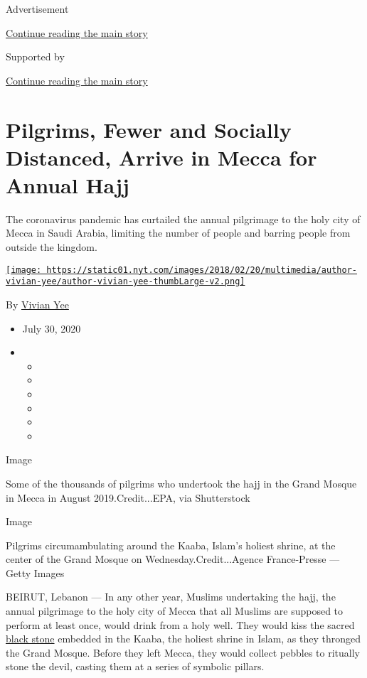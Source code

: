 Advertisement

\protect\hyperlink{after-top}{Continue reading the main story}

Supported by

\protect\hyperlink{after-sponsor}{Continue reading the main story}

\hypertarget{pilgrims-fewer-and-socially-distanced-arrive-in-mecca-for-annual-hajj}{%
\section{Pilgrims, Fewer and Socially Distanced, Arrive in Mecca for
Annual
Hajj}\label{pilgrims-fewer-and-socially-distanced-arrive-in-mecca-for-annual-hajj}}

The coronavirus pandemic has curtailed the annual pilgrimage to the holy
city of Mecca in Saudi Arabia, limiting the number of people and barring
people from outside the kingdom.

\href{https://www.nytimes.com/by/vivian-yee}{\texttt{[image: https://static01.nyt.com/images/2018/02/20/multimedia/author-vivian-yee/author-vivian-yee-thumbLarge-v2.png]}}

By \href{https://www.nytimes.com/by/vivian-yee}{Vivian Yee}

\begin{itemize}
\item
  July 30, 2020
\item
  \begin{itemize}
  \item
  \item
  \item
  \item
  \item
  \item
  \end{itemize}
\end{itemize}

Image

Some of the thousands of pilgrims who undertook the hajj in the Grand
Mosque in Mecca in August 2019.Credit...EPA, via Shutterstock

Image

Pilgrims circumambulating around the Kaaba, Islam's holiest shrine, at
the center of the Grand Mosque on Wednesday.Credit...Agence
France-Presse --- Getty Images

BEIRUT, Lebanon --- In any other year, Muslims undertaking the hajj, the
annual pilgrimage to the holy city of Mecca that all Muslims are
supposed to perform at least once, would drink from a holy well. They
would kiss the sacred
\href{https://www.britannica.com/topic/Black-Stone-of-Mecca}{black
stone} embedded in the Kaaba, the holiest shrine in Islam, as they
thronged the Grand Mosque. Before they left Mecca, they would collect
pebbles to ritually stone the devil, casting them at a series of
symbolic pillars.

